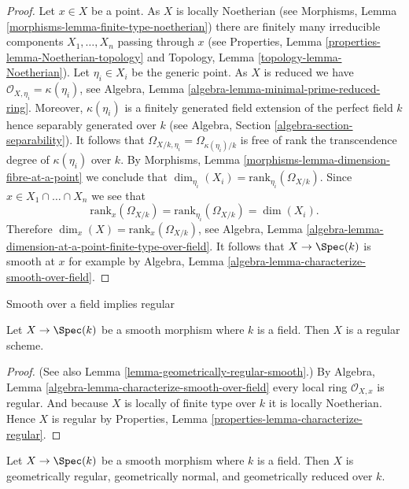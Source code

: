 \begin{proof}
Let $x \in X$ be a point. As $X$ is locally Noetherian (see
Morphisms, Lemma \ref{morphisms-lemma-finite-type-noetherian})
there are finitely many irreducible components
$X_1, \ldots, X_n$ passing through $x$ (see
Properties, Lemma \ref{properties-lemma-Noetherian-topology} and
Topology, Lemma \ref{topology-lemma-Noetherian}).
Let $\eta_i \in X_i$ be the generic point. As $X$ is reduced we have
$\mathcal{O}_{X, \eta_i} = \kappa(\eta_i)$, see
Algebra, Lemma \ref{algebra-lemma-minimal-prime-reduced-ring}.
Moreover, $\kappa(\eta_i)$ is a finitely generated field extension
of the perfect field $k$ hence separably generated over $k$ (see
Algebra, Section \ref{algebra-section-separability}).
It follows that $\Omega_{X/k, \eta_i} = \Omega_{\kappa(\eta_i)/k}$
is free of rank the transcendence degree of $\kappa(\eta_i)$ over $k$. By
Morphisms, Lemma \ref{morphisms-lemma-dimension-fibre-at-a-point}
we conclude that $\dim_{\eta_i}(X_i) = \text{rank}_{\eta_i}(\Omega_{X/k})$.
Since $x \in X_1 \cap \ldots \cap X_n$ we see that
$$
\text{rank}_x(\Omega_{X/k}) = \text{rank}_{\eta_i}(\Omega_{X/k}) = \dim(X_i).
$$
Therefore $\dim_x(X) = \text{rank}_x(\Omega_{X/k})$, see
Algebra, Lemma \ref{algebra-lemma-dimension-at-a-point-finite-type-over-field}.
It follows that $X \to \Spec(k)$ is smooth at $x$ for example by
Algebra, Lemma \ref{algebra-lemma-characterize-smooth-over-field}.
\end{proof}

\begin{lemma}
\label{lemma-smooth-regular}
\begin{slogan}
Smooth over a field implies regular
\end{slogan}
Let $X \to \Spec(k)$ be a smooth morphism where $k$ is a field.
Then $X$ is a regular scheme.
\end{lemma}

\begin{proof}
(See also
Lemma \ref{lemma-geometrically-regular-smooth}.)
By
Algebra, Lemma \ref{algebra-lemma-characterize-smooth-over-field}
every local ring $\mathcal{O}_{X, x}$ is regular.
And because $X$ is locally of finite type over $k$ it is locally
Noetherian. Hence $X$ is regular by
Properties, Lemma \ref{properties-lemma-characterize-regular}.
\end{proof}

\begin{lemma}
\label{lemma-smooth-geometrically-normal}
Let $X \to \Spec(k)$ be a smooth morphism where $k$ is a field.
Then $X$ is geometrically regular, geometrically normal, and
geometrically reduced over $k$.
\end{lemma}

